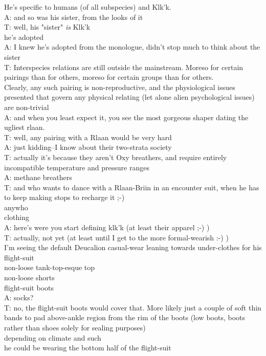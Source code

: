 He's specific to humans (of all subspecies) and Klk'k.\\
A: and so was his sister, from the looks of it\\
T: well, his "sister" {\em is} Klk'k\\
he's adopted\\
A: I knew he's adopted from the monologue, didn't stop much to think about the sister\\
T: Interspecies relations are still outside the mainstream. Moreso for certain pairings than for others, moreso for certain groups than for others.\\
Clearly, any such pairing is non-reproductive, and the physiological issues presented that govern any physical relating (let alone alien psychological issues) are non-trivial\\
A: and when you least expect it, you see the most gorgeous shaper dating the ugliest rlaan.\\
T: well, any pairing with a Rlaan would be very hard\\
A: just kidding--I know about their two-strata society\\
T: actually it's because they aren't Oxy breathers, and require entirely incompatible temperature and pressure ranges\\
A: methane breathers\\
T: and who wants to dance with a Rlaan-Briin in an encounter suit, when he has to keep making stops to recharge it ;-)\\
anywho\\
clothing\\
A: here's were you start defining klk'k (at least their apparel ;-) )\\
T: actually, not yet (at least until I get to the more formal-wearish :-) )\\
I'm seeing the default Deucalion casual-wear leaning towards under-clothes for his flight-suit\\
non-loose tank-top-esque top\\
non-loose shorts\\
flight-suit boots\\
A: socks?\\
T: no, the flight-suit boots would cover that. More likely just a couple of soft thin bands to pad above-ankle region from the rim of the boots (low boots, boots rather than shoes solely for sealing purposes)\\
depending on climate and such\\
he could be wearing the bottom half of the flight-suit\\
